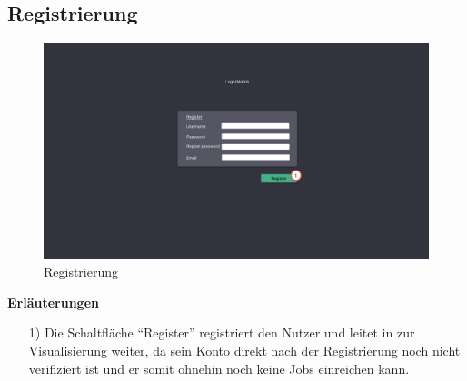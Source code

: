 \newpage
\subsection{Registrierung}
\label{pages:register}
\begin{figure}[H]
    \centering
    \includegraphics[width=\textwidth]{images-interface/v3_interface/register_page_v3.pdf}
    \caption{Registrierung}
    \label{fig:register}
\end{figure}
\textbf{Erläuterungen}
\begin{itemize}
    \item[1)] Die Schaltfläche \enquote{Register} registriert den Nutzer und leitet in zur \hyperref[pages:visualization]{Visualisierung} weiter, da sein Konto direkt nach der Registrierung noch nicht verifiziert ist und er somit ohnehin noch keine Jobs einreichen kann.
\end{itemize}



\newpage
